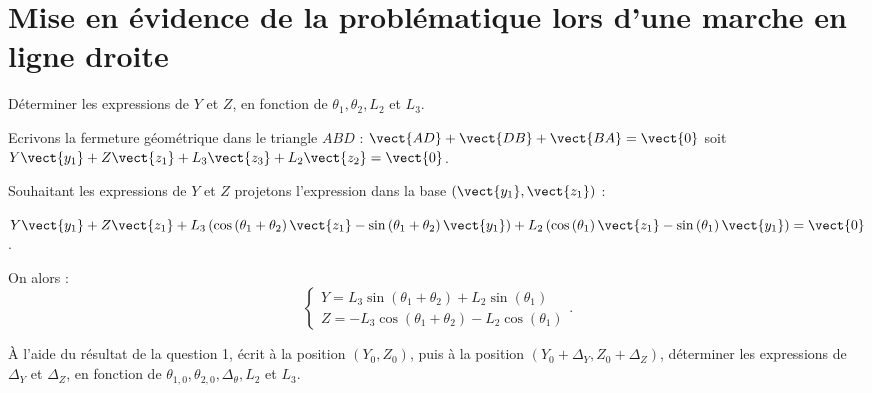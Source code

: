 \documentclass[11pt]{article}
\begin{document}
\UPSTIpreambuleEpreuve	%



\section{Mise en évidence de la problématique lors d'une marche en ligne droite}



\UPSTIquestion Déterminer les expressions de $Y$ et $Z$, en fonction de $\theta_{1}, \theta_{2}, L_{2}$ et $L_{3}$.

\begin{UPSTIcorrige}
Ecrivons la fermeture géométrique dans le triangle $ABD$ : $\vect{AD}+ \vect{DB}+\vect{BA} = \vect{0}$ soit $Y\vect{y_1}+Z\vect{z_1}+ L_3 \vect{z_3}+ L_2 \vect{z_2} = \vect{0}$.

Souhaitant les expressions de $Y$ et $Z$ projetons l'expression dans la base $\left(\vect{y_1},\vect{z_1}\right)$ :

$Y\vect{y_1}+Z\vect{z_1}
+L_3 \left( \cos \left(\theta_1 + \theta_2 \right) \vect{z_1} - \sin \left(\theta_1 + \theta_2 \right) \vect{y_1}\right) 
+ L_2 \left( \cos \left(\theta_1 \right) \vect{z_1} - \sin \left(\theta_1  \right) \vect{y_1}\right)  = \vect{0}$.

On alors :
$$
\left\{
\begin{array}{l}
Y =  L_3 \sin  \left(\theta_1 + \theta_2 \right)  + L_2 \sin \left(\theta_1  \right) \\
Z =- L_3 \cos \left(\theta_1 + \theta_2 \right) - L_2 \cos \left(\theta_1 \right)  
\end{array}.
\right.
$$

\end{UPSTIcorrige}

\UPSTIquestion À l'aide du résultat de la question 1, écrit à la position $\left(Y_{0}, Z_{0}\right)$, puis à la position $\left(Y_{0}+\Delta_{Y}, Z_{0}+\Delta_{Z}\right)$, déterminer les expressions de $\Delta_{Y}$ et $\Delta_{Z}$, en fonction de $\theta_{1,0}, \theta_{2,0}, \Delta_{\theta}, L_{2}$ et $L_{3}$.
\end{document}
